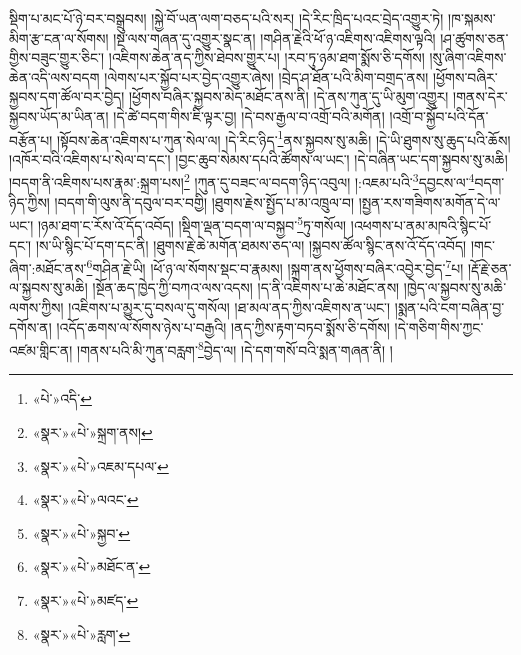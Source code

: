 སྡིག་པ་མང་པོ་ཉེ་བར་བསྒྲུབས། །སྐྱེ་བོ་ཡན་ལག་བཅད་པའི་སར། །དེ་རིང་ཁྲིད་པའང་བྲེད་འགྱུར་ཏེ། །ཁ་སྐམས་མིག་རྩ་ངན་ལ་སོགས། །སྔ་ལས་གཞན་དུ་འགྱུར་སྣང་ན། །གཤིན་རྗེའི་ཕོ་ཉ་འཇིགས་འཇིགས་ལྟའི། །ཤ་ཚུགས་ཅན་གྱིས་བཟུང་གྱུར་ཅིང་། །འཇིགས་ཆེན་ནད་ཀྱིས་ཐེབས་གྱུར་པ། །རབ་ཏུ་ཉམ་ཐག་སྨོས་ཅི་དགོས། །སུ་ཞིག་འཇིགས་ཆེན་འདི་ལས་བདག །ལེགས་པར་སྐྱོབ་པར་བྱེད་འགྱུར་ཞེས། །བྲེད་ཤ་ཐོན་པའི་མིག་བགྲད་ནས། །ཕྱོགས་བཞིར་སྐྱབས་དག་ཚོལ་བར་བྱེད། །ཕྱོགས་བཞིར་སྐྱབས་མེད་མཐོང་ནས་ནི། །དེ་ནས་ཀུན་དུ་ཡི་མུག་འགྱུར། །གནས་དེར་སྐྱབས་ཡོད་མ་ཡིན་ན། །དེ་ཚེ་བདག་གིས་ཇི་ལྟར་བྱ། །དེ་བས་རྒྱལ་བ་འགྲོ་བའི་མགོན། །འགྲོ་བ་སྐྱོབ་པའི་དོན་བརྩོན་པ། །སྟོབས་ཆེན་འཇིགས་པ་ཀུན་སེལ་ལ། །དེ་རིང་ཉིད་\footnote{«པེ་»འདི་}ནས་སྐྱབས་སུ་མཆི། །དེ་ཡི་ཐུགས་སུ་ཆུད་པའི་ཆོས། །འཁོར་བའི་འཇིགས་པ་སེལ་བ་དང་། །བྱང་ཆུབ་སེམས་དཔའི་ཚོགས་ལ་ཡང་། །དེ་བཞིན་ཡང་དག་སྐྱབས་སུ་མཆི། །བདག་ནི་འཇིགས་པས་རྣམ་:སྐྲག་པས།\footnote{«སྣར་»«པེ་»སྐྲག་ནས།} །ཀུན་དུ་བཟང་ལ་བདག་ཉིད་འབུལ། །:འཇམ་པའི་\footnote{«སྣར་»«པེ་»འཇམ་དཔལ་}དབྱངས་ལ་\footnote{«སྣར་»«པེ་»ལའང་}བདག་ཉིད་ཀྱིས། །བདག་གི་ལུས་ནི་དབུལ་བར་བགྱི། །ཐུགས་རྗེས་སྤྱོད་པ་མ་འཁྲུལ་བ། །སྤྱན་རས་གཟིགས་མགོན་དེ་ལ་ཡང་། །ཉམ་ཐག་ང་རོས་འོ་དོད་འབོད། །སྡིག་ལྡན་བདག་ལ་བསྐྱབ་\footnote{«སྣར་»«པེ་»སྐྱབ་}ཏུ་གསོལ། །འཕགས་པ་ནམ་མཁའི་སྙིང་པོ་དང་། །ས་ཡི་སྙིང་པོ་དག་དང་ནི། །ཐུགས་རྗེ་ཆེ་མགོན་ཐམས་ཅད་ལ། །སྐྱབས་ཚོལ་སྙིང་ནས་འོ་དོད་འབོད། །གང་ཞིག་:མཐོང་ནས་\footnote{«སྣར་»«པེ་»མཐོང་ན་}གཤིན་རྗེ་ཡི། །ཕོ་ཉ་ལ་སོགས་སྡང་བ་རྣམས། །སྐྲག་ནས་ཕྱོགས་བཞིར་འབྱེར་བྱེད་\footnote{«སྣར་»«པེ་»མཛད་}པ། །རྡོ་རྗེ་ཅན་ལ་སྐྱབས་སུ་མཆི། །སྔོན་ཆད་ཁྱེད་ཀྱི་བཀའ་ལས་འདས། །ད་ནི་འཇིགས་པ་ཆེ་མཐོང་ནས། །ཁྱེད་ལ་སྐྱབས་སུ་མཆི་ལགས་ཀྱིས། །འཇིགས་པ་མྱུར་དུ་བསལ་དུ་གསོལ། །ཐ་མལ་ནད་ཀྱིས་འཇིགས་ན་ཡང་། །སྨན་པའི་ངག་བཞིན་བྱ་དགོས་ན། །འདོད་ཆགས་ལ་སོགས་ཉེས་པ་བརྒྱའི། །ནད་ཀྱིས་རྟག་བཏབ་སྨོས་ཅི་དགོས། །དེ་གཅིག་གིས་ཀྱང་འཛམ་གླིང་ན། །གནས་པའི་མི་ཀུན་བརླག་\footnote{«སྣར་»«པེ་»རླག་}བྱེད་ལ། །དེ་དག་གསོ་བའི་སྨན་གཞན་ནི། །
